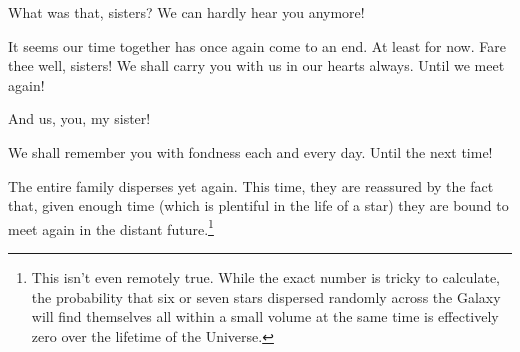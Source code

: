 \documentclass[main.tex]{subfiles}
\begin{document}
\par \Lacedaemon What was that, sisters?  We can hardly hear you anymore!

\par \Celaeno It seems our time together has once again come to an end.  At least for now.  Fare thee well, sisters!  We shall carry you with us in our hearts always.  Until we meet again!

\par \Maia And us, you, my sister!

\par \Merope We shall remember you with fondness each and every day.  Until the next time!  

\par \nar The entire family disperses yet again.  This time, they are reassured by the fact that, given enough time (which is plentiful in the life of a star) they are bound to meet again in the distant future.\footnote{This isn't even remotely true.  While the exact number is tricky to calculate, the probability that six or seven stars dispersed randomly across the Galaxy will find themselves all within a small volume at the same time is effectively zero over the lifetime of the Universe.}

\end{document}

